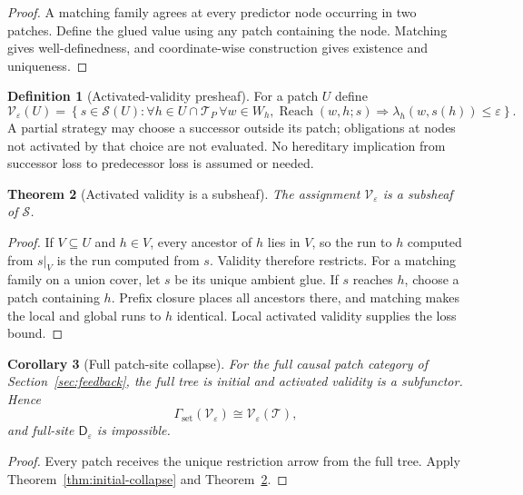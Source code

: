 \documentclass[11pt]{article}
\theoremstyle{plain}
\newtheorem{theorem}{Theorem}[section]
\newtheorem{corollary}[theorem]{Corollary}
\theoremstyle{definition}
\newtheorem{definition}[theorem]{Definition}
\theoremstyle{remark}
\newcommand{\eps}{\varepsilon}
\begin{document}
\begin{proof}
A matching family agrees at every predictor node occurring in two patches.
Define the glued value using any patch containing the node. Matching gives
well-definedness, and coordinate-wise construction gives existence and
uniqueness.
\end{proof}

\begin{definition}[Activated-validity presheaf]\label{def:activated}
For a patch $U$ define
\[
\mathscr V_\eps(U)=
\left\{s\in\mathscr S(U):
\forall h\in U\cap \mathcal T_P\,\forall w\in W_h,
\operatorname{Reach}(w,h;s)
\Rightarrow
\lambda_h(w,s(h))\le\eps
\right\}.
\]
A partial strategy may choose a successor outside its patch; obligations at
nodes not activated by that choice are not evaluated. No hereditary implication
from successor loss to predecessor loss is assumed or needed.
\end{definition}

\begin{theorem}[Activated validity is a subsheaf]\label{thm:activated-sheaf}
The assignment $\mathscr V_\eps$ is a subsheaf of $\mathscr S$.
\end{theorem}

\begin{proof}
If $V\subseteq U$ and $h\in V$, every ancestor of $h$ lies in $V$, so the run
to $h$ computed from $s|_V$ is the run computed from $s$. Validity therefore
restricts. For a matching family on a union cover, let $s$ be its unique ambient
glue. If $s$ reaches $h$, choose a patch containing $h$. Prefix closure places
all ancestors there, and matching makes the local and global runs to $h$
identical. Local activated validity supplies the loss bound.
\end{proof}

\begin{corollary}[Full patch-site collapse]\label{cor:patch-collapse}
For the full causal patch category of Section~\ref{sec:feedback}, the full tree
is initial and activated validity is a subfunctor. Hence
\[
\Gamma_{\mathrm{set}}(\mathscr V_\eps)
\cong\mathscr V_\eps(\mathcal T),
\]
and full-site $\mathsf D_\eps$ is impossible.
\end{corollary}

\begin{proof}
Every patch receives the unique restriction arrow from the full tree. Apply
Theorem~\ref{thm:initial-collapse} and
Theorem~\ref{thm:activated-sheaf}.
\end{proof}
\end{document}
